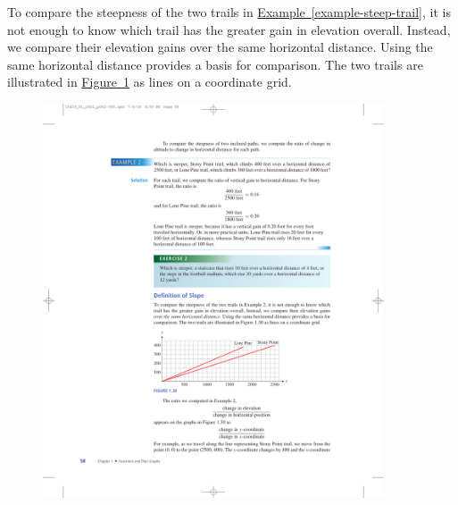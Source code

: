 \documentclass[10pt,]{book}
\theoremstyle{plain}
\theoremstyle{definition}
\theoremstyle{definition}
\theoremstyle{definition}
\theoremstyle{definition}
\numberwithin{equation}{section}
\begin{document}
    To compare the steepness of the two trails in \hyperref[example-steep-trail]{Example~\ref{example-steep-trail}}, it is not enough to know which trail has the greater gain in elevation overall. Instead, we compare their elevation gains over the same horizontal distance. Using the same horizontal distance provides a basis for comparison. The two trails are illustrated in \hyperref[fig-trail-climb-grid]{Figure~\ref{fig-trail-climb-grid}} as lines on a coordinate grid.
%
\leavevmode%
\begin{figure}
\centering
\includegraphics[width=0.90\textwidth,]{images/fig-trail-climb-grid.pdf}\caption{\label{fig-trail-climb-grid}}
\end{figure}
\par
\end{document}
